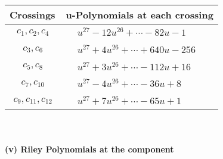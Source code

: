 \documentclass[1p]{elsarticle_modified}
\theoremstyle{definition}
\begin{document}
\begin{tabular}{m{50pt}|m{274pt}}
Crossings & \hspace{64pt}u-Polynomials at each crossing \\
\hline $$\begin{aligned}c_{1},c_{2},c_{4}\end{aligned}$$&$\begin{aligned}
&u^{27}-12 u^{26}+\cdots-82 u-1
\end{aligned}$\\
\hline $$\begin{aligned}c_{3},c_{6}\end{aligned}$$&$\begin{aligned}
&u^{27}+4 u^{26}+\cdots+640 u-256
\end{aligned}$\\
\hline $$\begin{aligned}c_{5},c_{8}\end{aligned}$$&$\begin{aligned}
&u^{27}+3 u^{26}+\cdots-112 u+16
\end{aligned}$\\
\hline $$\begin{aligned}c_{7},c_{10}\end{aligned}$$&$\begin{aligned}
&u^{27}-4 u^{26}+\cdots-36 u+8
\end{aligned}$\\
\hline $$\begin{aligned}c_{9},c_{11},c_{12}\end{aligned}$$&$\begin{aligned}
&u^{27}+7 u^{26}+\cdots-65 u+1
\end{aligned}$\\
\hline
\end{tabular}\\~\\
\newpage\renewcommand{\arraystretch}{1}
\flushleft \textbf{(v) Riley Polynomials at the component}\newline \\
\end{document}
